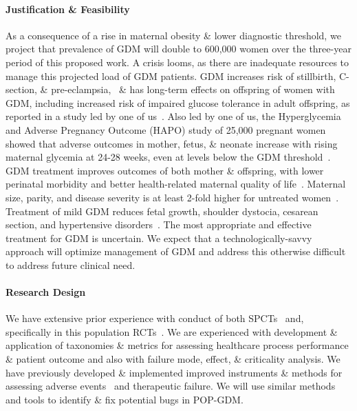 \paragraph{Justification \& Feasibility}
 As a consequence of a rise in
maternal obesity \& lower diagnostic threshold, we project that
prevalence of GDM will double to 600,000 women over the three-year
period of this proposed work. A crisis looms, as there are inadequate
resources to manage this projected load of GDM patients. GDM increases
risk of stillbirth, C-section, \& pre-eclampsia,~\citep{Langer2006} \& has
long-term effects on offspring of women with GDM, including increased
risk of impaired glucose tolerance in adult offspring, as reported in
a study led by one of us~\citep{Metzger2007}. Also led by one of us, the
Hyperglycemia and Adverse Pregnancy Outcome (HAPO) study of 25,000
pregnant women showed that adverse outcomes in mother, fetus, \&
neonate increase with rising maternal glycemia at 24-28 weeks, even at
levels below the GDM threshold~\citep{Metzger 2008}. GDM treatment improves
outcomes of both mother \& offspring, with lower perinatal morbidity
and better health-related maternal quality of
life~\citep{Crowther2005}. 
Maternal size, parity, and disease severity is at least 2-fold
higher for untreated women~\citep{Langer2005a}. Treatment of mild GDM
reduces fetal growth, shoulder dystocia, cesarean section, and
hypertensive disorders~\citep{LandonPeaceman2009}. The most appropriate
and effective treatment for GDM is uncertain. We expect that a
technologically-savvy approach will optimize management of GDM and
address this otherwise difficult to address future clinical need.

\paragraph{Research Design}
We have extensive prior experience with conduct of both
SPCTs~\citep{Belknap2008,GraumlichBelknap2000} and, specifically in
this population RCTs~\citep{LandonPeaceman2008}. We are experienced with
development \& application of taxonomies \& metrics for assessing
healthcare process performance \& patient outcome and also with
failure mode, effect, \& criticality analysis. We have previously
developed \& implemented improved instruments \& methods for assessing
adverse events~\citep{Belknap2010} and therapeutic failure. We will use
similar methods and tools to identify \& fix potential bugs in
POP-GDM.

